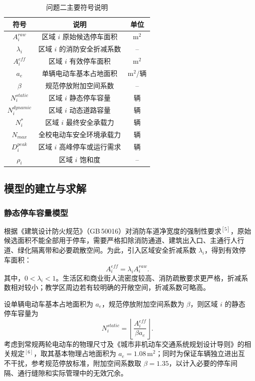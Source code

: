 \documentclass[UTF8,zihao=-4,a4paper]{ctexart}
\numberwithin{table}{section}
\numberwithin{figure}{section}
\numberwithin{equation}{section}
\begin{document}
\begin{table}[H]
\footnotesize
\centering
\caption{问题二主要符号说明}
\label{tab:symbols_q2}
\begin{tabular}{ccc}
\toprule
\textbf{符号} & \textbf{说明} & \textbf{单位} \\
\midrule
$A_i^{raw}$ & 区域 $i$ 原始候选停车面积 & $\text{m}^2$ \\
$\lambda_i$ & 区域 $i$ 的消防安全折减系数 & -- \\
$A_i^{eff}$ & 区域 $i$ 有效停车面积 & $\text{m}^2$ \\
$a_e$ & 单辆电动车基本占地面积 & $\text{m}^2$/辆 \\
$\beta$ & 规范停放附加空间系数 & -- \\
$N_i^{static}$ & 区域 $i$ 静态停车容量 & 辆 \\
$N_i^{dynamic}$ & 区域 $i$ 动态道路容量 & 辆 \\
$N_i^*$ & 区域 $i$ 最终安全承载力 & 辆 \\
$N_{max}$ & 全校电动车安全环境承载力 & 辆 \\
$D_i^{peak}$ & 区域 $i$ 高峰停车或运行需求 & 辆 \\
$\rho_i$ & 区域 $i$ 饱和度 & -- \\
\bottomrule
\end{tabular}
\end{table}

\subsection{模型的建立与求解}

\subsubsection{静态停车容量模型}

根据《建筑设计防火规范》（GB\,50016）对消防车道净宽度的强制性要求$^{[5]}$，原始候选面积不能全部用于停车，需要严格扣除消防通道、建筑出入口、主通行人行道、绿化隔离带和必要疏散空间。为此，引入区域安全折减系数 $\lambda_i$，得到有效停车面积：
\begin{equation}
A_i^{eff}=\lambda_i A_i^{raw}.
\end{equation}
其中，$0<\lambda_i<1$。生活区和商业街人流密度较高、消防疏散要求更严格，折减系数相对较小；教学区周边若有较明确的开敞空间，折减系数可略高。

设单辆电动车基本占地面积为 $a_e$，规范停放附加空间系数为 $\beta$，则区域 $i$ 的静态停车容量为
\begin{equation}
N_i^{static}=\left\lfloor \frac{A_i^{eff}}{\beta a_e}\right\rfloor .
\end{equation}
考虑到常规两轮电动车的物理尺寸及《城市非机动车交通系统规划设计导则》的相关规定$^{[6]}$，取其基本物理占地面积为 $a_e=1.08\,\text{m}^2$；同时为保证车辆独立进出互不干扰，参考规范停放标准，附加空间系数取 $\beta=1.35$，以计入必要的停车间隔、通行缝隙和实际管理中的无效冗余。
\end{document}
